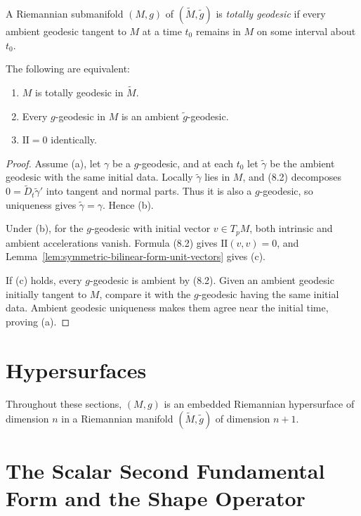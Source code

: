 A Riemannian submanifold $(M,g)$ of $(\widetilde M,\widetilde g)$ is
\emph{totally geodesic} if every ambient geodesic tangent to $M$ at a time
$t_0$ remains in $M$ on some interval about $t_0$.

\begin{proposition}
\label{prop:totally-geodesic-equivalence}

The following are equivalent:
\begin{enumerate}
\item[(a)] $M$ is totally geodesic in $\widetilde M$.
\item[(b)] Every $g$-geodesic in $M$ is an ambient
$\widetilde g$-geodesic.
\item[(c)] $\mathrm{II}=0$ identically.
\end{enumerate}
\end{proposition}

\begin{proof}
\sketch Assume (a), let $\gamma$ be a $g$-geodesic, and at each $t_0$ let
$\widetilde\gamma$ be the ambient geodesic with the same initial data.
Locally $\widetilde\gamma$ lies in $M$, and (8.2) decomposes
$0=\widetilde D_t\widetilde\gamma'$ into tangent and normal parts. Thus it is
also a $g$-geodesic, so uniqueness gives
$\widetilde\gamma=\gamma$. Hence (b).

Under (b), for the $g$-geodesic with initial vector $v\in T_pM$, both
intrinsic and ambient accelerations vanish. Formula (8.2) gives
$\mathrm{II}(v,v)=0$, and
Lemma~\ref{lem:symmetric-bilinear-form-unit-vectors} gives (c).

If (c) holds, every $g$-geodesic is ambient by (8.2). Given an ambient
geodesic initially tangent to $M$, compare it with the $g$-geodesic having
the same initial data. Ambient geodesic uniqueness makes them agree near the
initial time, proving (a).
\end{proof}
\section{Hypersurfaces}

Throughout these sections, $(M,g)$ is an embedded Riemannian hypersurface of
dimension $n$ in a Riemannian manifold $(\widetilde M,\widetilde g)$ of
dimension $n+1$.

\section{The Scalar Second Fundamental Form and the Shape Operator}

